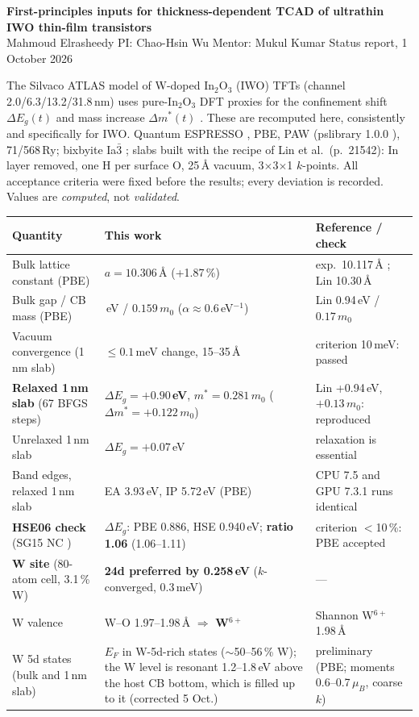 \documentclass[9pt]{extarticle}
\newcommand{\sect}[1]{\par\vspace{3pt}{\bfseries #1}\par\vspace{1pt}}
\newcommand{\InO}{In$_2$O$_3$}
\begin{document}
\begin{center}
{\large\bfseries First-principles inputs for thickness-dependent TCAD of ultrathin IWO thin-film transistors}\\[2pt]
Mahmoud Elrasheedy \quad PI: Chao-Hsin Wu \quad Mentor: Mukul Kumar \quad Status report, 1 October 2026
\end{center}

\sect{1. Aim and method}
The Silvaco ATLAS model of W-doped \InO{} (IWO) TFTs (channel 2.0/6.3/13.2/31.8\,nm) uses pure-\InO{} DFT proxies for the
confinement shift $\Delta E_g(t)$ and mass increase $\Delta m^*(t)$ \cite{lin}. These are recomputed here, consistently and
specifically for IWO. Quantum ESPRESSO \cite{qe}, PBE, PAW (pslibrary 1.0.0 \cite{dc}), 71/568\,Ry; bixbyite Ia$\bar 3$
\cite{mar}; slabs built with the recipe of Lin et al.\ (p.~21542): In layer removed, one H per surface O, 25\,\AA{} vacuum,
3$\times$3$\times$1 $k$-points. All acceptance criteria were fixed before the results; every deviation is recorded.
Values are \emph{computed}, not \emph{validated}.

\sect{2. Results}
\begin{tabularx}{\textwidth}{@{}>{\raggedright\arraybackslash}p{4.3cm}>{\raggedright\arraybackslash}X>{\raggedright\arraybackslash}p{4.4cm}@{}}
\toprule
Quantity & This work & Reference / check \\
\midrule
Bulk lattice constant (PBE) & $a = 10.306$\,\AA{} (+1.87\,\%) & exp.\ 10.117\,\AA{} \cite{mar}; Lin 10.30\,\AA \\
Bulk gap / CB mass (PBE) & 0.889\,eV / $0.159\,m_0$ ($\alpha \approx 0.6$\,eV$^{-1}$) & Lin 0.94\,eV / $0.17\,m_0$ \\
Vacuum convergence (1\,nm slab) & $\le 0.1$\,meV change, 15--35\,\AA & criterion 10\,meV: passed \\
\textbf{Relaxed 1\,nm slab} (67 BFGS steps) & \textbf{$\Delta E_g = +0.90$\,eV}, $m^* = 0.281\,m_0$ (\textbf{$\Delta m^* = +0.122\,m_0$}) & Lin +0.94\,eV, $+0.13\,m_0$: reproduced \\
Unrelaxed 1\,nm slab & $\Delta E_g = +0.07$\,eV & relaxation is essential \\
Band edges, relaxed 1\,nm slab & EA 3.93\,eV, IP 5.72\,eV (PBE) & CPU 7.5 and GPU 7.3.1 runs identical \\
\textbf{HSE06 check} \cite{hse} (SG15 NC \cite{sg15}) & $\Delta E_g$: PBE 0.886, HSE 0.940\,eV; \textbf{ratio 1.06} (1.06--1.11) & criterion $<$10\,\%: PBE accepted \\
\textbf{W site} (80-atom cell, 3.1\,\% W) & \textbf{24d preferred by 0.258\,eV} ($k$-converged, 0.3\,meV) & --- \\
W valence & W--O 1.97--1.98\,\AA{} $\Rightarrow$ \textbf{W$^{6+}$} & Shannon W$^{6+}$ 1.98\,\AA{} \cite{sh} \\
W 5d states (bulk and 1\,nm slab) & $E_F$ in W-5d-rich states ($\sim$50--56\,\% W); the W level is resonant 1.2--1.8\,eV above the host CB bottom, which is filled up to it (corrected 5 Oct.) & preliminary (PBE; moments 0.6--0.7\,$\mu_B$, coarse $k$) \\
\bottomrule
\end{tabularx}
\end{document}
